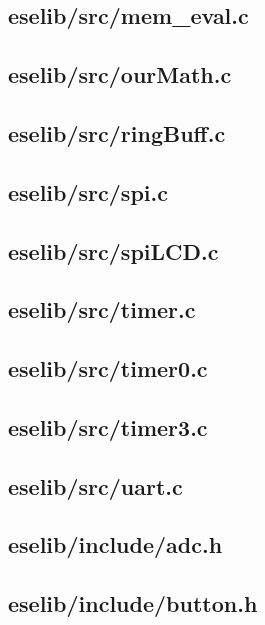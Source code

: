 \documentclass[12pt,a4paper,titlepage,oneside]{article}
\begin{document}
\subsection{eselib/src/mem\_eval.c}

\newpage
\subsection{eselib/src/ourMath.c}

\newpage
\subsection{eselib/src/ringBuff.c}

\newpage
\subsection{eselib/src/spi.c}

\newpage
\subsection{eselib/src/spiLCD.c}

\newpage
\subsection{eselib/src/timer.c}

\newpage
\subsection{eselib/src/timer0.c}

\newpage
\subsection{eselib/src/timer3.c}

\newpage
\subsection{eselib/src/uart.c}

\newpage

\subsection{eselib/include/adc.h}

\newpage
\subsection{eselib/include/button.h}

\newpage
\end{document}
